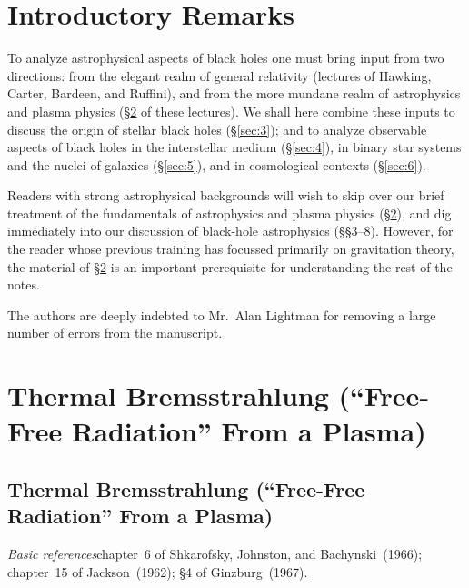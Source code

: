 
\section{Introductory Remarks}
\label{sec:1}

To analyze astrophysical aspects of black holes one must bring input from two
directions: from the elegant realm of general relativity (lectures of Hawking,
Carter, Bardeen, and Ruffini), and from the more mundane realm of astrophysics
and plasma physics (\S\ref{sec:2} of these lectures).  We shall here combine these
inputs to discuss the origin of stellar black holes (\S\ref{sec:3}); and to analyze observable
aspects of black holes in the interstellar medium (\S\ref{sec:4}), in binary star systems and
the nuclei of galaxies (\S\ref{sec:5}), and in cosmological contexts (\S\ref{sec:6}).

Readers with strong astrophysical backgrounds will wish to skip over our
brief treatment of the fundamentals of astrophysics and plasma physics (\S\ref{sec:2}),
and dig immediately into our discussion of black-hole astrophysics (\S\S{}3--8).
However, for the reader whose previous training has focussed primarily on
gravitation theory, the material of \S\ref{sec:2} is an important prerequisite for understanding
the rest of the notes.

The authors are deeply indebted to Mr.\ Alan Lightman for removing a large
number of errors from the manuscript.



\section{Thermal Bremsstrahlung (``Free-Free Radiation'' From a Plasma)}
\label{sec:2}

\subsection{Thermal Bremsstrahlung (``Free-Free Radiation'' From a Plasma)}
\label{sec:2.1}

\textit{Basic references}\quad chapter~6 of Shkarofsky, Johnston, and
Bachynski~(1966)\cite{Shkarofsky1966};
chapter~15 of Jackson~(1962)\cite{Jackson1962}; \S4 of
Ginzburg~(1967)\cite{Ginzburg1967}.

